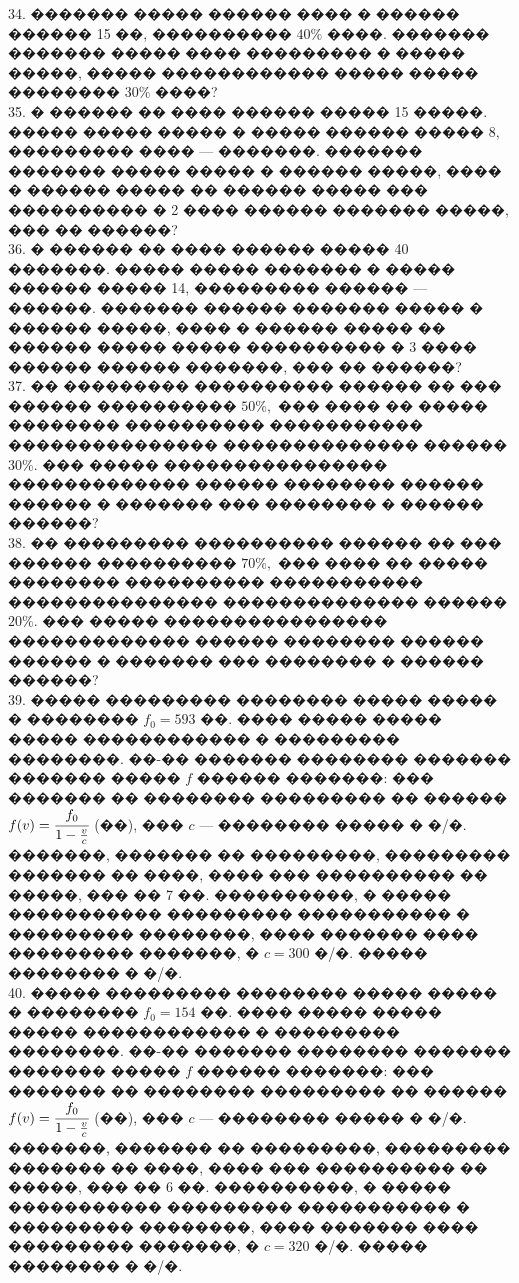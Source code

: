 \documentclass[12pt]{article}
\begin{document}
34. ������� ����� ������ ���� � ������ ������ 15 ��, ���������� $40\%$ ����. ������� ������� ����� ���� ��������� � ����� �����, ����� ������������ ����� ����� �������� $30\%$ ����?\\
35. � ������ �� ���� ������ ����� 15 �����. ����� ����� ����� � ����� ������ ����� 8, ��������� ���� --- �������. ������� ������� ����� ����� � ������ �����, ���� � ������ ����� �� ������ ����� ��� ���������� � 2 ���� ������ ������� �����, ��� �� ������?\\
36. � ������ �� ���� ������ ����� 40 �������. ����� ����� ������� � ����� ������ ����� 14, ��������� ������ --- ������. ������� ������ ������� ����� � ������ �����, ���� � ������ ����� �� ������ ����� ����� ���������� � 3 ���� ������ ������ �������, ��� �� ������?\\
37. �� ��������� ���������� ������ �� ��� ������ ���������� $50\%,$ ��� ���� �� ����� �������� ���������� ����������� ��������������� �������������� ������ $30\%.$ ��� ����� ���������������� ������������� ������ �������� ������ ������ � ������� ��� �������� � ������ ������?\\
38. �� ��������� ���������� ������ �� ��� ������ ���������� $70\%,$ ��� ���� �� ����� �������� ���������� ����������� ��������������� �������������� ������ $20\%.$ ��� ����� ���������������� ������������� ������ �������� ������ ������ � ������� ��� �������� � ������ ������?\\
39. ����� ��������� �������� ����� ����� � �������� $f_0=593$ ��. ���� ����� ����� ����� ������������ � ��������� ��������. ��-�� ������� �������� ������� ������� ����� $f$ ������ �������: ��� ������� �� �������� ��������� �� ������ $f(v)=\cfrac{f_0}{1-\frac{v}{c}}$ (��), ��� $c$ --- �������� ����� � �/�. �������, ������� �� ���������, ��������� ������� �� ����, ���� ��� ���������� �� �����, ��� �� 7 ��. ����������, � ����� ����������� ��������� ����������� � ��������� ��������, ���� ������� ���� ��������� �������, � $c=300$ �/�. ����� �������� � �/�.\\
40. ����� ��������� �������� ����� ����� � �������� $f_0=154$ ��. ���� ����� ����� ����� ������������ � ��������� ��������. ��-�� ������� �������� ������� ������� ����� $f$ ������ �������: ��� ������� �� �������� ��������� �� ������ $f(v)=\cfrac{f_0}{1-\frac{v}{c}}$ (��), ��� $c$ --- �������� ����� � �/�. �������, ������� �� ���������, ��������� ������� �� ����, ���� ��� ���������� �� �����, ��� �� 6 ��. ����������, � ����� ����������� ��������� ����������� � ��������� ��������, ���� ������� ���� ��������� �������, � $c=320$ �/�. ����� �������� � �/�.\\
\end{document}
